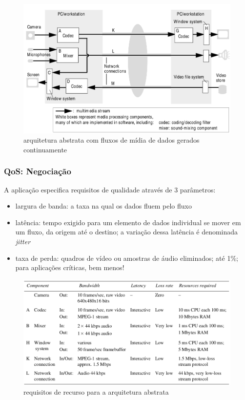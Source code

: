 \documentclass[]{beamer}
\begin{document}
\begin{frame}
  \begin{figure}[hbtp]
   \caption{arquitetura abstrata com fluxos de mídia de dados gerados continuamente}
   \begin{center}
    \includegraphics[scale=0.31]{arquitetura_abstrata.png}
   \end{center}
  \end{figure}
\end{frame}

\begin{frame}
  \frametitle{QoS: Negociação}
A aplicação especifica requisitos de qualidade através de 3 parâmetros: 
\begin{itemize}
  \item largura de banda: a taxa na qual os dados fluem pelo fluxo
  \item latência: tempo exigido para um elemento de dados individual se mover
em um fluxo, da origem até o destino; a variação dessa latência é denominada \emph{jitter}
  \item taxa de perda: quadros de vídeo ou amostras de áudio eliminados; até 1\%; 
para aplicações críticas, bem menos!
\end{itemize}
\end{frame}

\begin{frame}

  \begin{figure}[hbtp]
   \caption{requisitos de recurso para a arquitetura abstrata}
   \begin{center}
    \includegraphics[scale=0.33]{requisitos_recursos.png}
   \end{center}
  \end{figure}
\end{frame}
\end{document}
